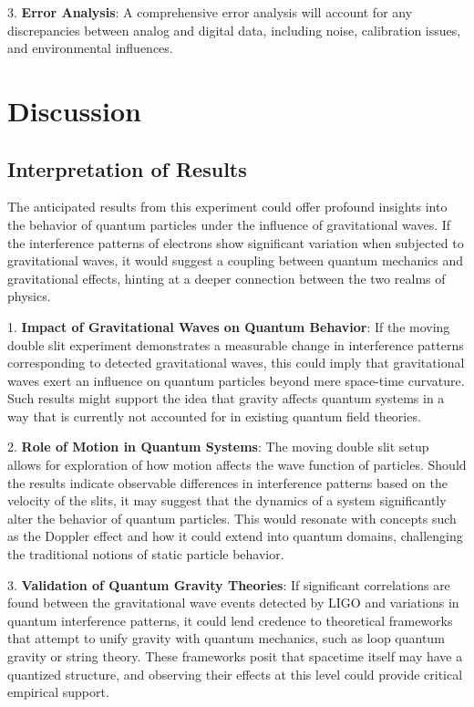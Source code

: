 \documentclass{article}
\begin{document}
3. \textbf{Error Analysis}: A comprehensive error analysis will account for any discrepancies between analog and digital data, including noise, calibration issues, and environmental influences.

\section{Discussion}

\subsection{Interpretation of Results}
The anticipated results from this experiment could offer profound insights into the behavior of quantum particles under the influence of gravitational waves. If the interference patterns of electrons show significant variation when subjected to gravitational waves, it would suggest a coupling between quantum mechanics and gravitational effects, hinting at a deeper connection between the two realms of physics.

1. \textbf{Impact of Gravitational Waves on Quantum Behavior}: If the moving double slit experiment demonstrates a measurable change in interference patterns corresponding to detected gravitational waves, this could imply that gravitational waves exert an influence on quantum particles beyond mere space-time curvature. Such results might support the idea that gravity affects quantum systems in a way that is currently not accounted for in existing quantum field theories.

2. \textbf{Role of Motion in Quantum Systems}: The moving double slit setup allows for exploration of how motion affects the wave function of particles. Should the results indicate observable differences in interference patterns based on the velocity of the slits, it may suggest that the dynamics of a system significantly alter the behavior of quantum particles. This would resonate with concepts such as the Doppler effect and how it could extend into quantum domains, challenging the traditional notions of static particle behavior.

3. \textbf{Validation of Quantum Gravity Theories}: If significant correlations are found between the gravitational wave events detected by LIGO and variations in quantum interference patterns, it could lend credence to theoretical frameworks that attempt to unify gravity with quantum mechanics, such as loop quantum gravity or string theory. These frameworks posit that spacetime itself may have a quantized structure, and observing their effects at this level could provide critical empirical support.
\end{document}
